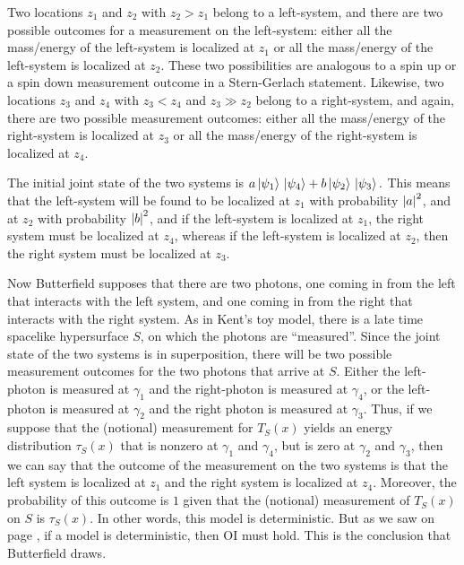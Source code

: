 Two locations $z_1$ and $z_2$ with $z_2>z_1$ belong to a left-system, and there are two possible outcomes for a measurement on the left-system: either all the mass/energy of the left-system is localized at $z_1$ or all the mass/energy of the left-system  is localized at $z_2$. These two possibilities are analogous to a spin up or a spin down measurement outcome in a Stern-Gerlach statement. Likewise, two locations $z_3$ and $z_4$ with $z_3<z_4$ and $z_3\gg z_2$ belong to a right-system, and again, there are two possible measurement outcomes: either all the mass/energy of the right-system is localized at $z_3$ or all the mass/energy of the right-system  is localized at $z_4$. 

The initial joint state of the two systems is 
$a \ket*{\psi_1}\ket*{\psi_4} +b \ket*{\psi_2}\ket*{\psi_3}.$
This means that the left-system will be found to be localized at $z_1$ with probability $\abs{a}^2$, and at $z_2$ with probability $\abs{b}^2$, and if the left-system is localized at $z_1$, the  right system must be localized at $z_4$, whereas if the left-system is localized at $z_2$, then the right system must be localized at $z_3$.  

Now Butterfield supposes that there are two photons, one coming in from the left that interacts with the left system, and one coming in from the right that interacts with the right system. As in Kent's toy model, there is a late time spacelike hypersurface $S$, on which the photons are ``measured''. Since the joint state of the two systems  is in superposition, there will be two possible measurement outcomes for the two photons that arrive at $S$. Either the left-photon is measured at $\gamma_1$ and the right-photon is measured at $\gamma_4$, or the left-photon is measured at $\gamma_2$ and the right photon is measured at $\gamma_3$. Thus, if we suppose that the (notional) measurement for $T_S(x)$ yields an energy distribution $\tau_S(x)$ that is nonzero at $\gamma_1$ and $\gamma_4$, but is zero at $\gamma_2$ and $\gamma_3$, then we can say that the outcome of the measurement on the two systems is that the left system is localized at $z_1$ and the right system is localized at $z_4$. Moreover, the probability of this outcome is $1$ given that the (notional) measurement of $T_S(x)$ on $S$ is $\tau_S(x)$. In other words, this model is deterministic. But as we saw on page \pageref{OIdet}, if a model is deterministic, then OI must hold. This is the conclusion that Butterfield draws. 

